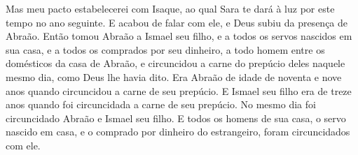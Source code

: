 {{Mas meu pacto estabelecerei com Isaque, ao qual Sara te dará à luz por este tempo no ano seguinte}.
E acabou de falar com ele, e Deus subiu da presença de Abraão.
Então tomou Abraão a Ismael seu filho, e a todos os servos nascidos em sua casa, e a todos os comprados por seu dinheiro, a todo homem entre os domésticos da casa de Abraão, e circuncidou a carne do prepúcio deles naquele mesmo dia, como Deus lhe havia dito.
Era Abraão de idade de noventa e nove anos quando circuncidou a carne de seu prepúcio.
E Ismael seu filho era de treze anos quando foi circuncidada a carne de seu prepúcio.
No mesmo dia foi circuncidado Abraão e Ismael seu filho.
E todos os homens de sua casa, o servo nascido em casa, e o comprado por dinheiro do estrangeiro, foram circuncidados com ele.
\par}

